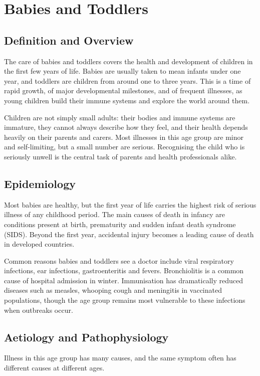 \chapter{Babies and Toddlers}

\section*{Definition and Overview}
The care of babies and toddlers covers the health and development of children in the first few years of life. Babies are usually taken to mean infants under one year, and toddlers are children from around one to three years. This is a time of rapid growth, of major developmental milestones, and of frequent illnesses, as young children build their immune systems and explore the world around them.

Children are not simply small adults: their bodies and immune systems are immature, they cannot always describe how they feel, and their health depends heavily on their parents and carers. Most illnesses in this age group are minor and self-limiting, but a small number are serious. Recognising the child who is seriously unwell is the central task of parents and health professionals alike.

\section*{Epidemiology}
Most babies are healthy, but the first year of life carries the highest risk of serious illness of any childhood period. The main causes of death in infancy are conditions present at birth, prematurity and sudden infant death syndrome (SIDS). Beyond the first year, accidental injury becomes a leading cause of death in developed countries.

Common reasons babies and toddlers see a doctor include viral respiratory infections, ear infections, gastroenteritis and fevers. Bronchiolitis is a common cause of hospital admission in winter. Immunisation has dramatically reduced diseases such as measles, whooping cough and meningitis in vaccinated populations, though the age group remains most vulnerable to these infections when outbreaks occur.

\section*{Aetiology and Pathophysiology}
Illness in this age group has many causes, and the same symptom often has different causes at different ages.

